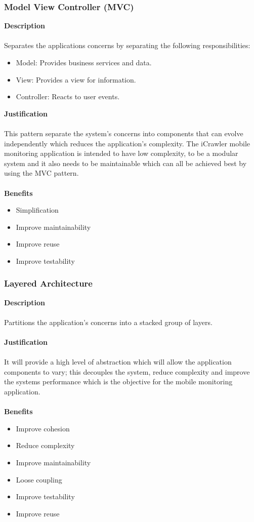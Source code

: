     \subsubsection*{Model View Controller (MVC)}
    \textbf{Description}\\\\
    Separates the applications concerns by separating the following responsibilities:
    \begin{itemize}
    \item Model: Provides business services and data.
    \item View: Provides a view for information.
    \item Controller: Reacts to user events. 
    \end{itemize}
    \textbf{Justification}\\\\
    This pattern separate the system's concerns into components that can evolve independently which reduces the application's complexity. The iCrawler mobile monitoring application is intended to have low complexity, to be a modular system and it also needs to be maintainable which can all be achieved best by using the MVC pattern. \\\\
    \textbf{Benefits}
    \begin{itemize}
    \item Simplification
    \item Improve maintainability
    \item Improve reuse
    \item Improve testability 
	\end{itemize} 
	
	\newpage
	\subsubsection{Layered Architecture}
	\textbf{Description}\\\\
	Partitions the application's concerns into a stacked group of layers.\\\\
	\textbf{Justification}\\\\
	It will provide a high level of abstraction which will allow the application components to vary; this decouples the system, reduce complexity and improve the systems performance which is the objective for the mobile monitoring application.\\\\
	\textbf{Benefits}
	\begin{itemize}
	\item Improve cohesion
	\item Reduce complexity
	\item Improve maintainability
	\item Loose coupling
	\item Improve testability
	\item Improve reuse
	\end{itemize}
	\newpage
